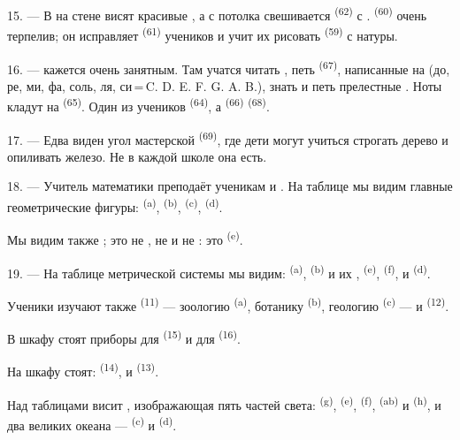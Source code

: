 15. --- В  на стене висят красивые ,
а с потолка свешивается  \textsuperscript{(62)} с .
 \textsuperscript{(60)} очень терпелив; он исправляет
 \textsuperscript{(61)} учеников и учит их рисовать 
\textsuperscript{(59)} с натуры.

16. ---  кажется очень занятным. Там учатся читать
, петь  \textsuperscript{(67)}, написанные на
 (до, ре, ми, фа, соль, ля, си\,=\,C. D. E. F. G. A.
B.), знать  и петь прелестные . Ноты кладут
на  \textsuperscript{(65)}. Один из учеников  \textsuperscript{(64)}, а  \textsuperscript{(66)}
 \textsuperscript{(68)}.

17. --- Едва виден угол мастерской  \textsuperscript{(69)},
где дети могут учиться строгать дерево и опиливать железо. Не в каждой
школе она есть.

\VUsaut{5.0mm}
\VUsaut{3.6mm}

18. --- Учитель математики преподаёт ученикам 
 и . На таблице мы
видим главные геометрические фигуры:  \textsuperscript{(a)},
 \textsuperscript{(b)},  \textsuperscript{(c)},
 \textsuperscript{(d)}.

Мы видим также ; это не , не
 и не : это 
\textsuperscript{(e)}.

19. --- На таблице метрической системы мы видим: 
\textsuperscript{(a)},  \textsuperscript{(b)} и их ,
 \textsuperscript{(e)},  \textsuperscript{(f)},
 и  \textsuperscript{(d)}.

Ученики изучают также  \textsuperscript{(11)} ---
зоологию \textsuperscript{(a)}, ботанику \textsuperscript{(b)}, геологию
\textsuperscript{(c)} --- и  \textsuperscript{(12)}.

В шкафу стоят приборы для  \textsuperscript{(15)} и для
 \textsuperscript{(16)}.

На шкафу стоят:  \textsuperscript{(14)},  и
 \textsuperscript{(13)}.

Над таблицами висит , изображающая пять частей света:
 \textsuperscript{(g)},  \textsuperscript{(e)},
 \textsuperscript{(f)},  \textsuperscript{(ab)} и
 \textsuperscript{(h)}, и два великих океана ---
 \textsuperscript{(c)} и  \textsuperscript{(d)}.
\VUsaut{6.0mm}
\VUfilet{22mm}

